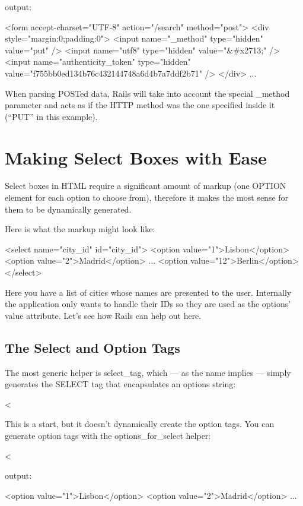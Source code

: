 \documentclass[10pt]{book}
\newenvironment{code}{%
  \scriptsize
    \verbatim
}{%
    \endverbatim
    \newline
}
\begin{document}
output:
\begin{code}
<form accept-charset="UTF-8" action="/search" method="post">
  <div style="margin:0;padding:0">
    <input name="_method" type="hidden" value="put" />
    <input name="utf8" type="hidden" value="&#x2713;" />
    <input name="authenticity_token" type="hidden" 
           value="f755bb0ed134b76c432144748a6d4b7a7ddf2b71" />
  </div>
  ...
\end{code}

When parsing POSTed data, Rails will take into account the special \_method parameter and acts as if the HTTP method was the one specified inside it (“PUT” in this example).

\section{ Making Select Boxes with Ease}

Select boxes in HTML require a significant amount of markup (one OPTION element for each option to choose from), therefore it makes the most sense for them to be dynamically generated.

Here is what the markup might look like:
\begin{code}
<select name="city_id" id="city_id">
  <option value="1">Lisbon</option>
  <option value="2">Madrid</option>
  ...
  <option value="12">Berlin</option>
</select>
\end{code}

Here you have a list of cities whose names are presented to the user.  Internally the application only wants to handle their IDs so they are  used as the options’ value attribute. Let’s see how Rails can help out  here.

\subsection{ The Select and Option Tags}

The most generic helper is select\_tag, which — as the name implies — simply generates the SELECT tag that encapsulates an options string:
\begin{code}
<%
\end{code}

This is a start, but it doesn’t dynamically create the option tags. You can generate option tags with the options\_for\_select helper:
\begin{code}
<%
 
output:
 
<option value="1">Lisbon</option>
<option value="2">Madrid</option>
...
\end{code}
\end{document}

